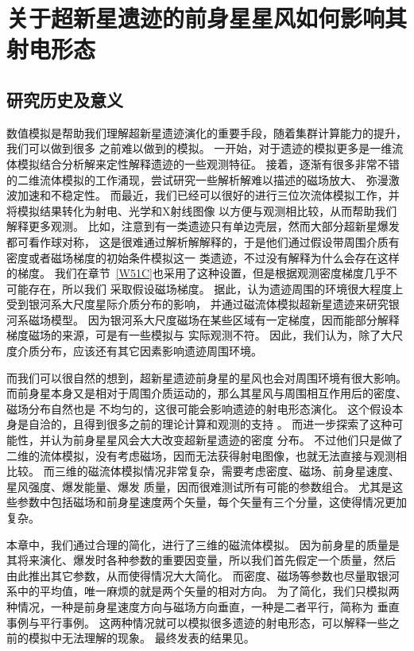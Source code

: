 \chapter{关于超新星遗迹的前身星星风如何影响其射电形态}
\label{SW}

\section{研究历史及意义}
\label{SWintro}
数值模拟是帮助我们理解超新星遗迹演化的重要手段，随着集群计算能力的提升，我们可以做到很多
之前难以做到的模拟。
一开始，对于遗迹的模拟更多是一维流体模拟结合分析解来定性解释遗迹的一些观测特征。
接着，逐渐有很多非常不错的二维流体模拟的工作涌现，尝试研究一些解析解难以描述的磁场放大、
弥漫激波加速和不稳定性\citep{Jun1996,Kang2006,Fang2012}。
而最近，我们已经可以很好的进行三位次流体模拟工作，并将模拟结果转化为射电、光学和X射线图像
以方便与观测相比较\citep{Orlando2007,Meyer2015,Zhang2017}，从而帮助我们解释更多观测。
比如，\citet{Orlando2007}注意到有一类遗迹只有单边壳层，然而大部分超新星爆发都可看作球对称，
这是很难通过解析解解释的，于是他们通过假设带周围介质有密度或者磁场梯度的初始条件模拟这一
类遗迹，不过没有解释为什么会存在这样的梯度。
我们在章节~\ref{W51C}也采用了这种设置，但是根据观测密度梯度几乎不可能存在，所以我们
采取假设磁场梯度。
据此，\citet{West2016}认为遗迹周围的环境很大程度上受到银河系大尺度星际介质分布的影响，
并通过磁流体模拟超新星遗迹来研究银河系磁场模型。
因为银河系大尺度磁场在某些区域有一定梯度，因而能部分解释梯度磁场的来源，可是有一些模拟与
实际观测不符。
因此，我们认为，除了大尺度介质分布，应该还有其它因素影响遗迹周围环境。

而我们可以很自然的想到，超新星遗迹前身星的星风也会对周围环境有很大影响。
而前身星本身又是相对于周围介质运动的，那么其星风与周围相互作用后的密度、磁场分布自然也是
不均匀的，这很可能会影响遗迹的射电形态演化。
这个假设本身是自洽的，且得到很多之前的理论计算和观测的支持
\citep{Chen1995,Zhang1996,Foster2004,Lee2010}。
而\citet{Meyer2015}进一步探索了这种可能性，并认为前身星星风会大大改变超新星遗迹的密度
分布。
不过他们只是做了二维的流体模拟，没有考虑磁场，因而无法获得射电图像，也就无法直接与观测相
比较。
而三维的磁流体模拟情况非常复杂，需要考虑密度、磁场、前身星速度、星风强度、爆发能量、爆发
质量，因而很难测试所有可能的参数组合。
尤其是这些参数中包括磁场和前身星速度两个矢量，每个矢量有三个分量，这使得情况更加复杂。

本章中，我们通过合理的简化，进行了三维的磁流体模拟。
因为前身星的质量是其将来演化、爆发时各种参数的重要因变量，所以我们首先假定一个质量，然后
由此推出其它参数，从而使得情况大大简化。
而密度、磁场等参数也尽量取银河系中的平均值，唯一麻烦的就是两个矢量的相对方向。
为了简化，我们只模拟两种情况，一种是前身星速度方向与磁场方向垂直，一种是二者平行，简称为
垂直事例与平行事例。
这两种情况就可以模拟很多遗迹的射电形态，可以解释一些之前的模拟中无法理解的现象。
最终发表的结果见\citet{Zhang2018}。

